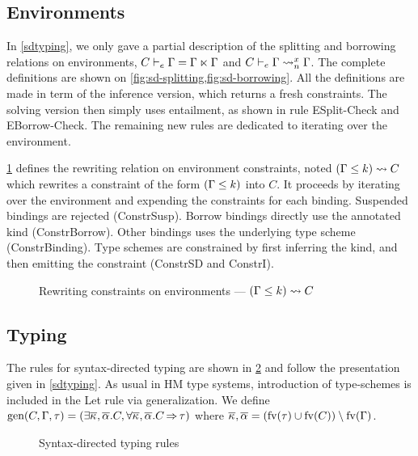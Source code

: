 \subsection{Environments}
\label{typ:extra:envs}

In \cref{sdtyping}, we only gave a partial description of
the splitting and borrowing relations on environments,
$\lsplit C\E\E\E$ and $\lregion C{x}\E\E$.
The complete definitions are shown on \cref{fig:sd-splitting,fig:sd-borrowing}.
All the definitions are made in term of the inference version, which
returns a fresh constraints. The solving version then simply
uses entailment, as shown in rule {\sc ESplit-Check} and
{\sc EBorrow-Check}.
The remaining new rules are dedicated to iterating over the environment.

\cref{fig:contraints-environments-types} defines
the rewriting relation on environment constraints,
noted $(\Gamma \leq k) \leadsto  C$ which rewrites a constraint of the form
$(\Gamma \leq k)$ into $C$. It proceeds by iterating over the environment
and expending the constraints for each binding.
Suspended bindings are rejected ({\sc ConstrSusp}).
Borrow bindings directly use the annotated kind ({\sc ConstrBorrow}).
Other bindings uses the underlying type scheme ({\sc ConstrBinding}).
Type schemes are constrained by first inferring the kind, and then
emitting the constraint ({\sc ConstrSD} and {\sc ConstrI}).


\begin{figure*}[!tb]
  
  \caption{Splitting --- environments $\lsplit
    C\E\E\E$; binders $\bsplit Cbbb$}
  \label{fig:sd-splitting}
  
  \caption{Borrowing --- environments $\lregion
    C{x}\E\E$; binders $\bregion C{x}bb$}
  \label{fig:sd-borrowing}
  
  \caption{Rewriting constraints on environments --- $(\Gamma \leq k) \leadsto  C$}
  \label{fig:contraints-environments-types}
\end{figure*}

\subsection{Typing}

The rules for syntax-directed typing are shown in \cref{fig:syntax-directed-typing}
and follow the presentation given in \cref{sdtyping}.
As usual in HM type systems, introduction of type-schemes
is included in the {\sc Let} rule via generalization.
We define $\operatorname{\text{gen}}(C,\Gamma,\tau) =
(\exists \overline{\kappa_{{}}},\overline{\alpha_{{}}}.C,
\forall \overline{\kappa_{{}}},\overline{\alpha_{{}}}.C \operatorname{\Rightarrow} \tau)$
where
$\overline{\kappa_{{}}},\overline{\alpha_{{}}} = (\operatorname{fv}(\tau)\cup\operatorname{fv}(C))\setminus\operatorname{fv}(\Gamma)$.


\begin{figure*}[hbtp]
  
  \caption{Syntax-directed typing rules}
  \label{fig:syntax-directed-typing}
\end{figure*}

